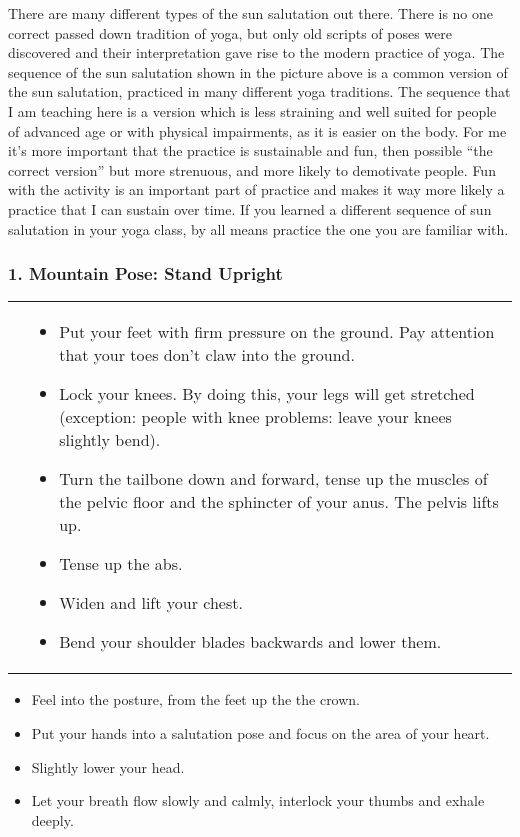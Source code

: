 \documentclass[../Book.Stress_regulation.tex]{subfiles}
\begin{document}
There are many different types of the sun salutation out there.
There is no one correct passed down tradition of yoga, but only old scripts of poses were discovered and their interpretation gave rise to the modern practice of yoga.
The sequence of the sun salutation shown in the picture above is a common version of the sun salutation, practiced in many different yoga traditions.
The sequence that I am teaching here is a version which is less straining and well suited for people of advanced age or with physical impairments, as it is easier on the body\cite{VidyaYoga}.
For me it's more important that the practice is sustainable and fun, then possible ``the correct version'' but more strenuous, and more likely to demotivate people.
Fun with the activity is an important part of practice and makes it way more likely a practice that I can sustain over time.
If you learned a different sequence of sun salutation in your yoga class, by all means  practice the one you are familiar with.

\newpage

\subsubsection{1. Mountain Pose: Stand Upright}

\begin{tabular}{p{1.4cm} p{10.1cm}}
  \raisebox{-1.1\totalheight}{\texttt{[image: SS\_Mountain]}} &                                                                     
\begin{itemize}
\item Put your feet with firm pressure on the ground. Pay attention that your toes don't claw into the ground.
\item Lock your knees. By doing this, your legs will get stretched (exception: people with knee problems: leave your knees slightly bend).
\item Turn the tailbone down and forward, tense up the muscles of the pelvic floor and the sphincter of your anus. The pelvis lifts up.
\item Tense up the abs.
\item Widen and lift your chest.
\item Bend your shoulder blades backwards and lower them.
\end{itemize}
\end{tabular}
\noindent \vspace{-5mm}
\begin{itemize}
\item Feel into the posture, from the feet up the the crown.
\item Put your hands into a salutation pose and focus on the area of your heart.
\item Slightly lower your head.
\item Let your breath flow slowly and calmly, interlock your thumbs and exhale deeply.
\end{itemize}
  
\end{document}
